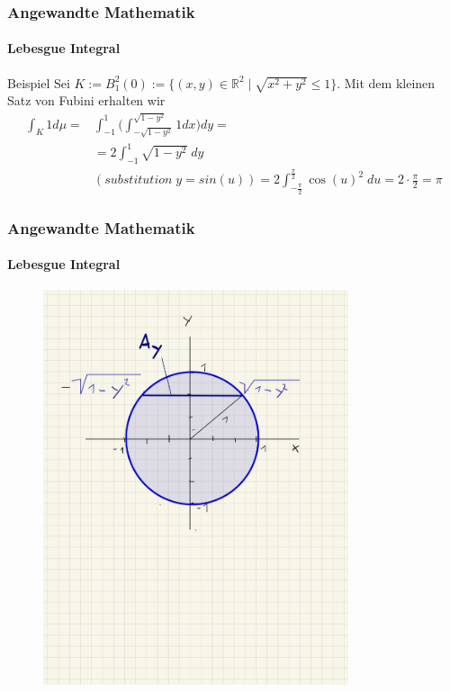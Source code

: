 \documentclass{beamer}
\begin{document}
\begin{frame}
    \frametitle{Angewandte Mathematik}
\framesubtitle{Lebesgue Integral}
\begin{block}{Beispiel}
Sei $K := B^2_1(0) := \{   (x,y) \in \mathbb{R}^2 \; | \; \sqrt{x^2 + y^2 } \leq 1\}$. Mit dem kleinen Satz von Fubini erhalten wir
\begin{align*}
\int_K 1 d \mu = &  \int_{-1}^{1} \biggl ( \int_{-\sqrt{1- y^2}}^{\sqrt{1- y^2}} 1 dx \biggr ) dy = \\ 
& =  2 \int_{-1}^{1}  \sqrt{1 - y^2}   \; dy  \\ 
 & (substitution \;   y = sin(u)) =   2 \int_{-\frac{\pi}{2}}^{\frac{\pi}{2}}   \cos(u)^2   \; du = 2 \cdot \frac{\pi}{2} = \pi
\end{align*}
\end{block}
 \end{frame}



\begin{frame}
    \frametitle{Angewandte Mathematik}
\framesubtitle{Lebesgue Integral}
\begin{figure}[H]
      \centering
    \includegraphics[width=0.8\textwidth]{images/Kreis}
\end{figure}
 \end{frame}
\end{document}
